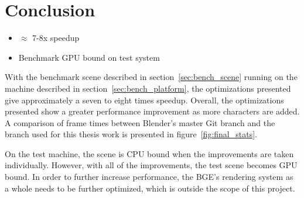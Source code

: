 \section{Conclusion}
\ifsummaries
\begin{itemize}
 \item $\approx$ 7-8x speedup
 \item Benchmark GPU bound on test system
\end{itemize}
\fi

With the benchmark scene described in section~\ref{sec:bench_scene} running on the machine described in section~\ref{sec:bench_platform}, the optimizations presented give approximately a seven to eight times speedup.
Overall, the optimizations presented show a greater performance improvement as more characters are added.
A comparison of frame times between Blender's master Git branch and the branch used for this thesis work is presented in figure~\ref{fig:final_stats}.


On the test machine, the scene is CPU bound when the improvements are taken individually.
However, with all of the improvements, the test scene becomes GPU bound.
In order to further increase performance, the BGE's rendering system as a whole needs to be further optimized, which is outside the scope of this project.

